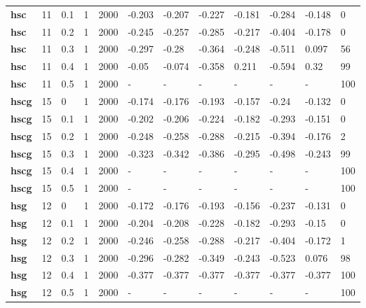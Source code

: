 \begin{longtable}[h]{|p{0.8cm}|p{1.5cm}|p{1cm}|p{1cm}|p{1cm}|p{1cm}|p{1cm}|p{1cm}|p{1cm}|p{1cm}|p{1cm}|p{1.5cm}|}
           \\
  \textbf{hsc } &  11         & 0.1 & 1 & 2000 & -0.203 & -0.207 & -0.227 & -0.181 & -0.284 & -0.148 &   0
           \\
  \textbf{hsc } &  11         & 0.2 & 1 & 2000 & -0.245 & -0.257 & -0.285 & -0.217 & -0.404 & -0.178 &   0
           \\
  \textbf{hsc } &  11         & 0.3 & 1 & 2000 & -0.297 &  -0.28 & -0.364 & -0.248 & -0.511 &  0.097 &  56
           \\
  \textbf{hsc } &  11         & 0.4 & 1 & 2000 &  -0.05 & -0.074 & -0.358 &  0.211 & -0.594 &   0.32 &  99
           \\
  \textbf{hsc } &  11         & 0.5 & 1 & 2000 & - & - & - & - & - & - & 100
           \\
  \textbf{hscg} &  15         &   0 & 1 & 2000 & -0.174 & -0.176 & -0.193 & -0.157 &  -0.24 & -0.132 &   0
           \\
  \textbf{hscg} &  15         & 0.1 & 1 & 2000 & -0.202 & -0.206 & -0.224 & -0.182 & -0.293 & -0.151 &   0
           \\
  \textbf{hscg} &  15         & 0.2 & 1 & 2000 & -0.248 & -0.258 & -0.288 & -0.215 & -0.394 & -0.176 &   2
           \\
  \textbf{hscg} &  15         & 0.3 & 1 & 2000 & -0.323 & -0.342 & -0.386 & -0.295 & -0.498 & -0.243 &  99
           \\
  \textbf{hscg} &  15         & 0.4 & 1 & 2000 & - & - & - & - & - & - & 100
           \\
  \textbf{hscg} &  15         & 0.5 & 1 & 2000 & - & - & - & - & - & - & 100
           \\
  \textbf{hsg } &  12         &   0 & 1 & 2000 & -0.172 & -0.176 & -0.193 & -0.156 & -0.237 & -0.131 &   0
           \\
  \textbf{hsg } &  12         & 0.1 & 1 & 2000 & -0.204 & -0.208 & -0.228 & -0.182 & -0.293 &  -0.15 &   0
           \\
  \textbf{hsg } &  12         & 0.2 & 1 & 2000 & -0.246 & -0.258 & -0.288 & -0.217 & -0.404 & -0.172 &   1
           \\
  \textbf{hsg } &  12         & 0.3 & 1 & 2000 & -0.296 & -0.282 & -0.349 & -0.243 & -0.523 &  0.076 &  98
           \\
  \textbf{hsg } &  12         & 0.4 & 1 & 2000 & -0.377 & -0.377 & -0.377 & -0.377 & -0.377 & -0.377 & 100
           \\
  \textbf{hsg } &  12         & 0.5 & 1 & 2000 & - & - & - & - & - & - & 100
           \\
 \end{longtable}
